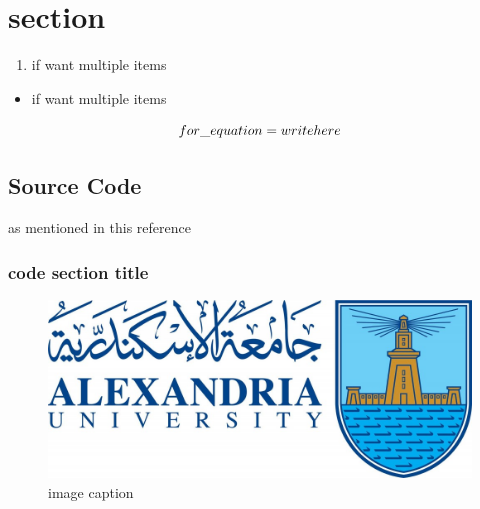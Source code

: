 \newpage
\section{section}

\begin{enumerate}
    \item if want multiple items
\end{enumerate}

\begin{itemize}
    \item if want multiple items
\end{itemize}

\begin{equation}
    \centering
    for\_equation = write here 
    \label{0}
\end{equation}

\subsection{Source Code} 

as mentioned in this reference \cite{ref} %

\subsubsection{code section title}



 \begin{figure}[!h]
     \centering
     \includegraphics[scale =0.3]{Images/ALEXU_1.jpg}
     \caption{image caption}
     \label{fig:enter}
 \end{figure}

